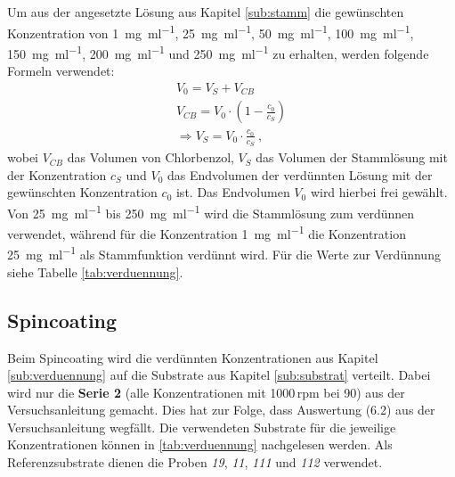 Um aus der angesetzte Lösung aus Kapitel \ref{sub:stamm} die gewünschten Konzentration von \SI{1}{\milli\gram\per\milli\litre}, \SI{25}{\milli\gram\per\milli\litre}, \SI{50}{\milli\gram\per\milli\litre}, \SI{100}{\milli\gram\per\milli\litre}, \SI{150}{\milli\gram\per\milli\litre}, \SI{200}{\milli\gram\per\milli\litre} und \SI{250}{\milli\gram\per\milli\litre} zu erhalten, werden folgende Formeln verwendet:
\begin{gather}
	V_0 = V_S + V_{CB}\\
	\boxed{V_{CB} = V_0 \cdot \left( 1 - \frac{c_0}{c_S} \right)}\\
	\Rightarrow \boxed{V_S = V_0 \cdot \frac{c_0}{c_S}}~,
	\label{eq:vol}
\end{gather}
wobei $V_{CB}$ das Volumen von Chlorbenzol, $V_S$ das Volumen der Stammlösung mit der Konzentration $c_S$ und $V_0$ das Endvolumen der verdünnten Lösung mit der gewünschten Konzentration $c_0$ ist. Das Endvolumen $V_0$ wird hierbei frei gewählt. Von \SI{25}{\milli\gram\per\milli\litre} bis \SI{250}{\milli\gram\per\milli\litre} wird die Stammlösung zum verdünnen verwendet, während für die Konzentration \SI{1}{\milli\gram\per\milli\litre} die Konzentration \SI{25}{\milli\gram\per\milli\litre} als Stammfunktion verdünnt wird. Für die Werte zur Verdünnung siehe Tabelle \ref{tab:verduennung}.

\subsection{Spincoating}
\label{sub:spin}

Beim Spincoating wird die verdünnten Konzentrationen aus Kapitel \ref{sub:verduennung} auf die Substrate aus Kapitel \ref{sub:substrat} verteilt. Dabei wird nur die \textbf{Serie 2} (alle Konzentrationen mit 1000\,rpm bei \SI{90}{\sec}) aus der Versuchsanleitung gemacht. Dies hat zur Folge, dass Auswertung (6.2) aus der Versuchsanleitung wegfällt. Die verwendeten Substrate für die jeweilige Konzentrationen können in \ref{tab:verduennung} nachgelesen werden. Als Referenzsubstrate dienen die Proben \textit{19}, \textit{11}, \textit{111} und \textit{112} verwendet.


